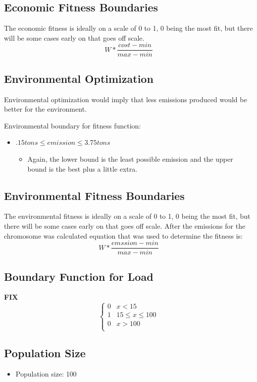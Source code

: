 \documentclass{article}
\begin{document}
    \subsection{Economic Fitness Boundaries}
    The economic fitness is ideally on a scale of 0 to 1, 0 being the most fit, but there will be some cases early on that goes off scale.
    \[W*\frac{cost-min}{max-min}\]
    
    \subsection{Environmental Optimization}
    Environmental optimization would imply that less emissions produced would be better for the environment.

    Environmental boundary for fitness function:
    \begin{itemize}
        \item \(.15  tons \leq emission \leq 3.75  tons\)
        \begin{itemize}
            \item Again, the lower bound is the least possible emission and the upper bound is the best plus a little extra.
        \end{itemize}
    \end{itemize}

    \subsection{Environmental Fitness Boundaries}
    The environmental fitness is ideally on a scale of 0 to 1, 0 being the most fit, but there will be some cases early on that goes off scale.
    After the emissions for the chromosome was calculated equation that was used to determine the fitness is:
    \[W*\frac{emssion-min}{max-min}\]

    \subsection{Boundary Function for Load}
    \textbf{FIX}
    \[ \begin{cases} 
        0 & x < 15 \\
        1 & 15\leq x\leq 100 \\
        0 & x > 100 \\
     \end{cases}
  \]

    \subsection{Population Size}
    \begin{itemize}
        \item Population size: 100    
    \end{itemize}
\end{document}
